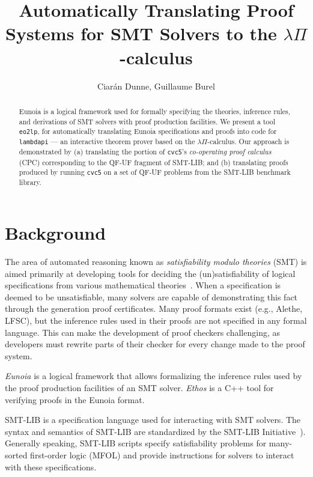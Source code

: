 \documentclass{article}
\title{
  Automatically Translating Proof Systems
  for SMT Solvers to the $\lambda\Pi$-calculus}
\author{Ciarán Dunne, Guillaume Burel}
\begin{document}
\maketitle

\begin{abstract}
	\noindent
	Eunoia is a logical framework used for formally specifying the
	theories, inference rules, and derivations of SMT solvers with
	proof production facilities.
	We present a tool \texttt{eo2lp}, for automatically translating Eunoia
	specifications and proofs into code for \texttt{lambdapi} ---
	an interactive theorem prover based on the $\lambda\Pi$-calculus.
	Our approach is demonstrated by
	(a) translating the portion of \texttt{cvc5}'s
	\textit{co-operating proof calculus} (CPC) corresponding to the QF-UF
	fragment of SMT-LIB; and
	(b) translating proofs produced by running \texttt{cvc5} on a set of
	QF-UF problems from the SMT-LIB benchmark library.
\end{abstract}

\section{Background}

The area of automated reasoning known as \emph{satisfiability modulo theories}
(SMT) is aimed primarily at developing tools for deciding the (un)satisfiability
of logical specifications from various mathematical theories~\cite{Barrett2021}.
%
When a specification is deemed to be unsatisfiable, many solvers are capable
of demonstrating this fact through the generation proof certificates.
%
Many proof formats exist (e.g., Alethe, LFSC), but the inference rules used
in their proofs are not specified in any formal language.
%
This can make the development of proof checkers challenging, as developers
must rewrite parts of their checker for every change made to the proof system.

\textit{Eunoia} is a logical framework that allows formalizing the inference
rules used by the proof production facilities of an SMT solver.
%
\textit{Ethos} is a C++ tool for verifying proofs in the Eunoia format.

SMT-LIB is a specification language used for interacting with SMT solvers.
The syntax and semantics of SMT-LIB are standardized by the
SMT-LIB Initiative~\autocite{Barrett2015-standard}).
%
Generally speaking, SMT-LIB scripts specify satisfiability problems for
many-sorted first-order logic (MFOL) and provide instructions for solvers
to interact with these specifications.
\end{document}
